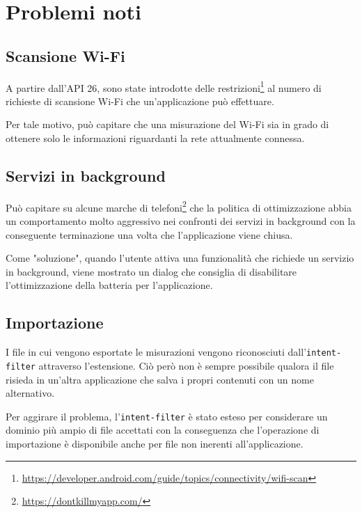 \documentclass[11pt]{article}
\begin{document}









\section{Problemi noti}

\subsection{Scansione Wi-Fi}
A partire dall'API 26, sono state introdotte delle restrizioni\footnote{\url{https://developer.android.com/guide/topics/connectivity/wifi-scan}} al numero di richieste di scansione Wi-Fi che un'applicazione può effettuare.

Per tale motivo, può capitare che una misurazione del Wi-Fi sia in grado di ottenere solo le informazioni riguardanti la rete attualmente connessa.


\subsection{Servizi in background}
Può capitare su alcune marche di telefoni\footnote{\url{https://dontkillmyapp.com/}} che la politica di ottimizzazione abbia un comportamento molto aggressivo nei confronti dei servizi in background con la conseguente terminazione una volta che l'applicazione viene chiusa.

Come "soluzione", quando l'utente attiva una funzionalità che richiede un servizio in background, viene mostrato un dialog che consiglia di disabilitare l'ottimizzazione della batteria per l'applicazione.


\subsection{Importazione}
I file in cui vengono esportate le misurazioni vengono riconosciuti dall'\texttt{intent-filter} attraverso l'estensione. Ciò però non è sempre possibile qualora il file risieda in un'altra applicazione che salva i propri contenuti con un nome alternativo.

Per aggirare il problema, l'\texttt{intent-filter} è stato esteso per considerare un dominio più ampio di file accettati con la conseguenza che l'operazione di importazione è disponibile anche per file non inerenti all'applicazione.
\end{document}
